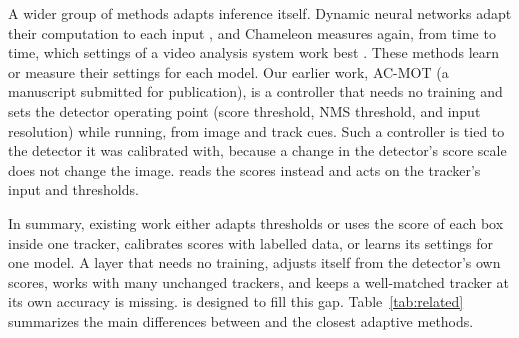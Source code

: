A wider group of methods adapts inference itself. Dynamic neural networks adapt their computation
to each input \cite{han2022dynamic}, and Chameleon measures again, from time to time, which settings
of a video analysis system work best \cite{jiang2018chameleon}. These methods learn or measure their
settings for each model. Our earlier work, AC-MOT (a manuscript submitted for publication), is a
controller that needs no training and sets the detector operating point (score threshold, NMS
threshold, and input resolution) while running, from image and track cues. Such a controller is
tied to the detector it was calibrated with, because a change in the detector's score scale does
not change the image. \scl{} reads the scores instead and acts on the tracker's input and
thresholds.

In summary, existing work either adapts thresholds or uses the score of each box inside one
tracker, calibrates scores with labelled data, or learns its settings for one model. A layer that
needs no training, adjusts itself from the detector's own scores, works with many unchanged
trackers, and keeps a well-matched tracker at its own accuracy is missing. \scl{} is designed to
fill this gap. Table~\ref{tab:related} summarizes the main differences between \scl{} and the
closest adaptive methods.


